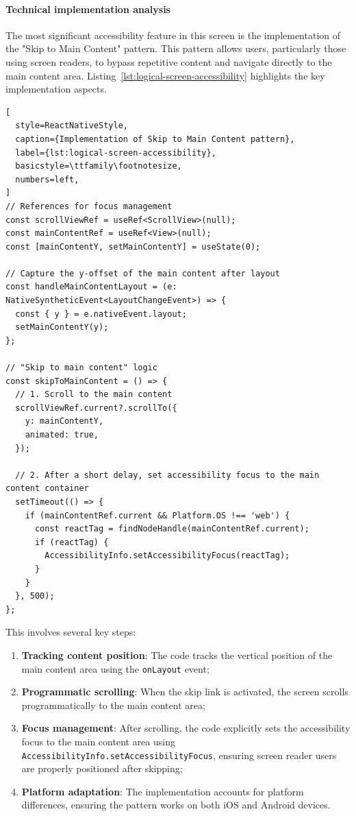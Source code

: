 \pagebreak

\paragraph{Technical implementation analysis}

The most significant accessibility feature in this screen is the implementation of the "Skip to Main Content" pattern. This pattern allows users, particularly those using screen readers, to bypass repetitive content and navigate directly to the main content area. Listing~\ref{lst:logical-screen-accessibility} highlights the key implementation aspects.

\begin{lstlisting}[
  style=ReactNativeStyle,
  caption={Implementation of Skip to Main Content pattern},
  label={lst:logical-screen-accessibility},
  basicstyle=\ttfamily\footnotesize,
  numbers=left,
]
// References for focus management
const scrollViewRef = useRef<ScrollView>(null);
const mainContentRef = useRef<View>(null);
const [mainContentY, setMainContentY] = useState(0);

// Capture the y-offset of the main content after layout
const handleMainContentLayout = (e: NativeSyntheticEvent<LayoutChangeEvent>) => {
  const { y } = e.nativeEvent.layout;
  setMainContentY(y);
};

// "Skip to main content" logic
const skipToMainContent = () => {
  // 1. Scroll to the main content
  scrollViewRef.current?.scrollTo({
    y: mainContentY,
    animated: true,
  });

  // 2. After a short delay, set accessibility focus to the main content container
  setTimeout(() => {
    if (mainContentRef.current && Platform.OS !== 'web') {
      const reactTag = findNodeHandle(mainContentRef.current);
      if (reactTag) {
        AccessibilityInfo.setAccessibilityFocus(reactTag);
      }
    }
  }, 500);
};
\end{lstlisting}

This involves several key steps:

\begin{enumerate}
    \item \textbf{Tracking content position}: The code tracks the vertical position of the main content area using the \texttt{onLayout} event;
    
    \item \textbf{Programmatic scrolling}: When the skip link is activated, the screen scrolls programmatically to the main content area;
    
    \item \textbf{Focus management}: After scrolling, the code explicitly sets the accessibility focus to the main content area using \texttt{AccessibilityInfo.setAccessibilityFocus}, ensuring screen reader users are properly positioned after skipping;
    
    \item \textbf{Platform adaptation}: The implementation accounts for platform differences, ensuring the pattern works on both iOS and Android devices.
\end{enumerate}

